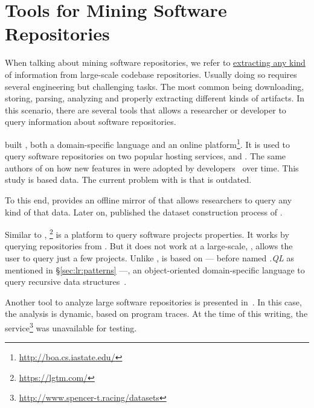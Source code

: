 \section{Tools for Mining Software Repositories}
\label{sec:lr:mining}

When talking about mining software repositories,
we refer to \underline{extracting any kind} of information from large-scale codebase repositories. 
Usually doing so requires several engineering but challenging tasks.
The most common being downloading, storing, parsing, analyzing and properly extracting different kinds of artifacts.
In this scenario, there are several tools that allows a researcher or developer to query information about software repositories.

\cite{dyerBoaLanguageInfrastructure2013,dyerDeclarativeVisitorsEase2013} built \boa{}, both a domain-specific language and an online platform\footnote{\url{http://boa.cs.iastate.edu/}}. 
It is used to query software repositories on two popular hosting services, \github{} and \sourceforge{}.
The same authors of \boa{}  on
how new features
in \java{} were adopted by developers~\cite{dyerMiningBillionsAST2014} over time.
This study is based \sourceforge{} data.
The current problem with \sourceforge{} is that is outdated.

To this end, \cite{gousiosGHTorentDatasetTool2013} provides an offline mirror of \github{} that allows researchers to query any kind of that data.
Later on, \cite{gousiosLeanGHTorrentGitHub2014} published the dataset construction process of \github{}.

Similar to \boa{}, \lgtm{}\footnote{\url{https://lgtm.com/}} is a platform to query software projects properties.
It works by querying repositories from \github{}.
But it does not work at a large-scale, \ie{}, \lgtm{} allows the user to query just a few projects.
Unlike \boa{}, \lgtm{} is based on \ql{} --- before named \emph{.QL} as mentioned in \S\ref{sec:lr:patterns} ---, an object-oriented domain-specific language to query recursive data structures~\cite{avgustinovQLObjectorientedQueries2016}.


Another tool to analyze large software repositories is presented in~\cite{brandauerSpencerInteractiveHeap2017}.
In this case, the analysis is dynamic, based on program traces. 
At the time of this writing, the service\footnote{\url{http://www.spencer-t.racing/datasets}} was unavailable for testing. 

